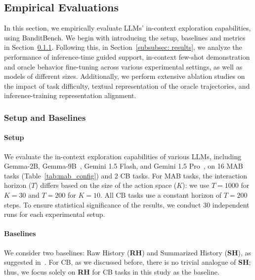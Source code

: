 \documentclass[11pt, logo]{googledeepmind}
\theoremstyle{plain}
\theoremstyle{definition}
\begin{document}
\subsection{Empirical Evaluations}
\label{subsec: eval_and_baselines}
In this section, we empirically evaluate LLMs' in-context exploration capabilities, using BanditBench. We begin with introducing the setup, baselines and metrics in Section~\ref{subsubsec: setup}. Following this, in Section~\ref{subsubsec: results}, we analyze the performance of inference-time guided support, in-context few-shot demonstration and oracle behavior fine-tuning across various experimental settings, as well as models of different sizes. Additionally, we perform extensive ablation studies on the impact of task difficulty, textual representation of the oracle trajectories, and inference-training representation alignment.
\subsubsection{Setup and Baselines}
\label{subsubsec: setup}
\paragraph{Setup} We evaluate the in-context exploration capabilities of various LLMs, including Gemma-2B, Gemma-9B~\citep{team2024gemma}, Gemini 1.5 Flash, and Gemini 1.5 Pro~\citep{reid2024gemini}, on 16 MAB tasks (Table~\ref{tab:mab_config}) and 2 CB tasks.
For MAB tasks, the interaction horizon ($T$) differs based on the size of the action space ($K$): we use $T=1000$ for $K=30$ and $T=200$ for $K=10$.
All CB tasks use a constant horizon of $T = 200$ steps.
To ensure statistical significance of the results, we conduct 30 independent runs for each experimental setup.
\paragraph{Baselines} We consider two baselines: Raw History (\textbf{RH}) and Summarized History (\textbf{SH}), as suggested in~\citet{krishnamurthy2024can}.
For CB, as we discussed before, there is no trivial analogue of \textbf{SH}; thus, we focus solely on \textbf{RH} for CB tasks in this study as the baseline.
\end{document}
